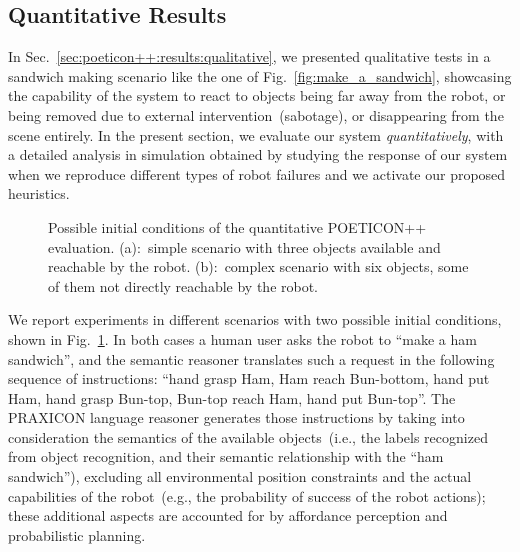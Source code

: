 \subsection{Quantitative Results}
\label{sec:poeticon++:results:quantitative}

In Sec.~\ref{sec:poeticon++:results:qualitative}, we presented qualitative tests in a sandwich making scenario like the one of Fig.~\ref{fig:make_a_sandwich}, showcasing the capability of the system to react to
objects being far away from the robot, or
being removed due to external intervention~(sabotage), or
disappearing from the scene entirely.
In the present section, we evaluate our system \emph{quantitatively}, with a detailed analysis in simulation obtained by studying the response of our system when we reproduce different types of robot failures and we activate our proposed heuristics.

\begin{figure}
 \quad
%
\caption[Possible initial conditions of the quantitative POETICON++ evaluation.]{Possible initial conditions of the quantitative POETICON++ evaluation. (a):~simple scenario with three objects available and reachable by the robot. (b):~complex scenario with six objects, some of them not directly reachable by the robot.}
\label{fig:simple3+complex6}
\end{figure}

We report experiments in different scenarios with two possible initial conditions, shown in Fig.~\ref{fig:simple3+complex6}.
In both cases a human user asks the robot to ``make a ham sandwich'', and the semantic reasoner translates such a request in the following sequence of instructions:
``hand grasp Ham,
Ham reach Bun-bottom,
hand put Ham,
hand grasp Bun-top,
Bun-top reach Ham,
hand put Bun-top''.
%
The PRAXICON language reasoner generates those instructions by taking into consideration the semantics of the available objects~(i.e., the labels recognized from object recognition, and their semantic relationship with the ``ham sandwich''), excluding all environmental position constraints and the actual capabilities of the robot~(e.g., the probability of success of the robot actions); these additional aspects are accounted for by affordance perception and probabilistic planning.

